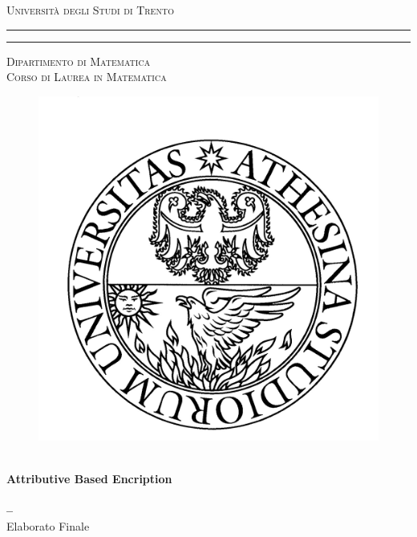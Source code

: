 \documentclass[a4paper,10pt, openright]{book}%
\theoremstyle{plain}%
\theoremstyle{definition}
\theoremstyle{remark}
\begin{document}
\frontmatter
\begin{titlepage}
\begin{center}
{{\Large{\textsc{Università degli Studi di Trento}}}}
\rule[0.1cm]{15.8cm}{0.1mm}
\rule[0.5cm]{15.8cm}{0.6mm}
{\small{\textsc { Dipartimento di Matematica \\
Corso di Laurea in Matematica}}}
\end{center}
\begin{center}
\begin{figure}[!htbp]
\includegraphics[scale=0.35]{unitn.jpg} \centering 
\centering
\end{figure}
\vspace{10mm}
\begin{center}
{\LARGE{\bf \-}}\\
\vspace{3mm}
{\LARGE\textbf{Attributive Based Encription}}\\
\vspace{3mm}
{\LARGE{\bf \-}}\\
\vspace{3mm}
{\LARGE{\bf --}}\\
\vspace{7mm} {\large{\sc Elaborato Finale}}
\end{center}
\vfill
\par
\noindent

\end{center}
\end{titlepage}
\end{document}
